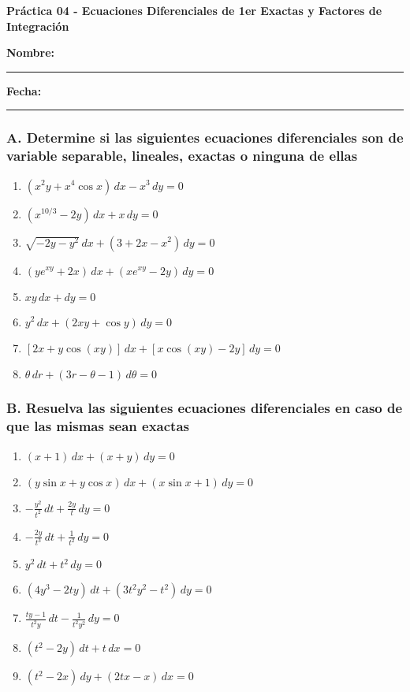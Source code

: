 \documentclass[a4paper,12pt]{article}
\begin{document}
\begin{center}
    \Large\textbf{Práctica 04 - Ecuaciones Diferenciales de 1er Exactas y Factores de Integración}\\[1cm]  

\end{center}
  \textbf{Nombre:} \rule{9cm}{0.4pt}  \textbf{Fecha:} \rule{4.5cm}{0.4pt}



\subsubsection*{A. Determine si las siguientes ecuaciones diferenciales son de variable separable, lineales, exactas o ninguna de ellas}

\begin{enumerate}
    \item \((x^2 y + x^4 \cos x) \, dx - x^3 \, dy = 0\)
    \item \((x^{10/3} - 2y) \, dx + x \, dy = 0\)
    \item \(\sqrt{-2y - y^2} \, dx + (3 + 2x - x^2) \, dy = 0\)
    \item \((y e^{xy} + 2x) \, dx + (x e^{xy} - 2y) \, dy = 0\)
    \item \(x y \, dx + dy = 0\)
    \item \(y^2 \, dx + (2xy + \cos y) \, dy = 0\)
    \item \([2x + y \cos(xy)] \, dx + [x \cos(xy) - 2y] \, dy = 0\)
    \item \(\theta \, dr + (3r - \theta - 1) \, d\theta = 0\)
\end{enumerate}

\subsubsection*{B. Resuelva las siguientes ecuaciones diferenciales en caso de que las mismas sean exactas}

\begin{enumerate}
  \item $(x+1)\, dx + (x+y)\, dy = 0$ 
\item $(y\sin x + y\cos x)\, dx + (x\sin x + 1)\, dy = 0$ 
\item $-\tfrac{y^2}{t^2}\, dt + \tfrac{2y}{t}\, dy = 0$
\item $-\tfrac{2y}{t^3}\, dt + \tfrac{1}{t^2}\, dy = 0$ 
\item $y^2\, dt + t^2\, dy = 0$ 
\item $(4y^3 - 2ty)\, dt + (3t^2y^2 - t^2)\, dy = 0$
\item $\tfrac{ty - 1}{t^2y}\, dt - \tfrac{1}{t^2y^2}\, dy = 0$
\item $(t^2 - 2y)\, dt + t\, dx = 0$
\item $(t^2 - 2x)\, dy + (2tx - x)\, dx = 0$
\end{enumerate}
\end{document}

